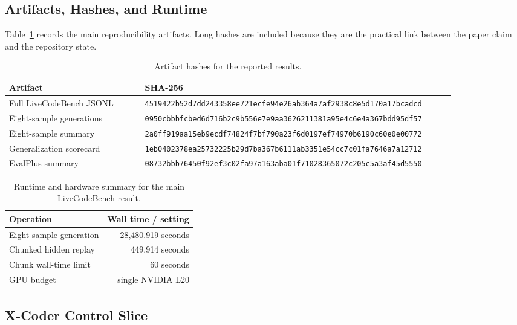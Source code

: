 \documentclass[11pt]{article}
\begin{document}
\subsection{Artifacts, Hashes, and Runtime}

Table~\ref{tab:artifacts} records the main reproducibility artifacts. Long
hashes are included because they are the practical link between the paper claim
and the repository state.

\begin{table}[H]
\centering
\scriptsize
\begin{tabular}{>{\raggedright\arraybackslash}p{0.28\linewidth}
                >{\raggedright\arraybackslash}p{0.64\linewidth}}
\toprule
Artifact & SHA-256 \\
\midrule
Full LiveCodeBench JSONL & \texttt{4519422b52d7dd243358ee721ecfe94e26ab364a7af2938c8e5d170a17bcadcd} \\
Eight-sample generations & \texttt{0950cbbbfcbed6d716b2c9b556e7e9aa3626211381a95e4c6e4a367bdd95df57} \\
Eight-sample summary & \texttt{2a0ff919aa15eb9ecdf74824f7bf790a23f6d0197ef74970b6190c60e0e00772} \\
Generalization scorecard & \texttt{1eb0402378ea25732225b29d7ba367b6111ab3351e54cc7c01fa7646a7a12712} \\
EvalPlus summary & \texttt{08732bbb76450f92ef3c02fa97a163aba01f71028365072c205c5a3af45d5550} \\
\bottomrule
\end{tabular}
\caption{Artifact hashes for the reported results.}
\label{tab:artifacts}
\end{table}

\begin{table}[H]
\centering
\begin{tabular}{lr}
\toprule
Operation & Wall time / setting \\
\midrule
Eight-sample generation & 28,480.919 seconds \\
Chunked hidden replay & 449.914 seconds \\
Chunk wall-time limit & 60 seconds \\
GPU budget & single NVIDIA L20 \\
\bottomrule
\end{tabular}
\caption{Runtime and hardware summary for the main LiveCodeBench result.}
\label{tab:runtime}
\end{table}

\subsection{X-Coder Control Slice}
\end{document}
